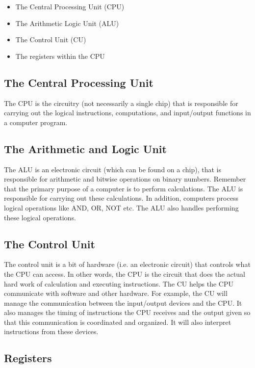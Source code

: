 \begin{itemize}
	\item The Central Processing Unit (CPU)
	\item The Arithmetic Logic Unit (ALU)
	\item The Control Unit (CU)
	\item The registers within the CPU
\end{itemize} 

\subsection*{The Central Processing Unit}
The CPU is the circuitry (not necessarily a single chip) that is responsible for carrying out the logical instructions, computations, and input/output functions in a computer program. 

\subsection*{The Arithmetic and Logic Unit}
The ALU is an electronic circuit (which can be found on a chip), that is responsible for arithmetic and bitwise operations on binary numbers. Remember that the primary purpose of a computer is to perform calculations. The ALU is responsible for carrying out these calculations. In addition, computers process logical operations like AND, OR, NOT etc. The ALU also handles performing these logical operations.


\subsection*{The Control Unit}
The control unit is a bit of hardware (i.e. an electronic circuit) that controls what the CPU can access. In other words, the CPU is the circuit that does the actual hard work of calculation and executing instructions. The CU helps the CPU communicate with software and other hardware. For example, the CU will manage the communication between the input/output devices and the CPU. It also manages the timing of instructions the CPU receives and the output given so that this communication is coordinated and organized. It will also interpret instructions from these devices. 

\subsection*{Registers}
